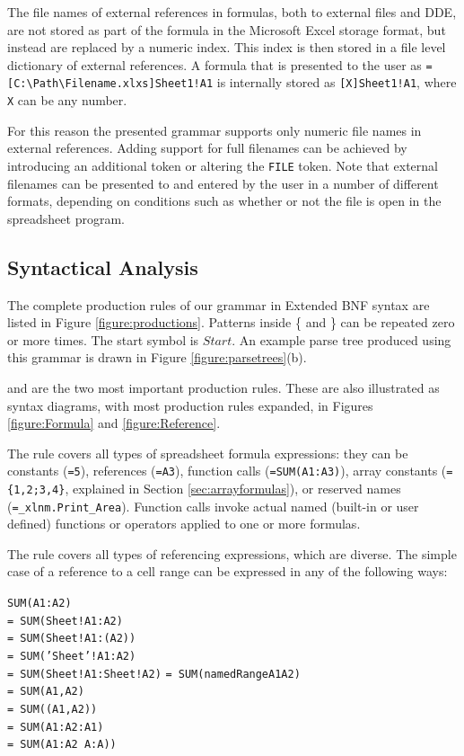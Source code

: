 \documentclass[conference]{IEEEtran}
\begin{document}
The file names of external references in formulas, both to external files and DDE, are not stored as part of the formula in the Microsoft Excel storage format, but instead are replaced by a numeric index.
This index is then stored in a file level dictionary of external references.
A formula that is presented to the user as \texttt{=[C:\textbackslash Path\textbackslash Filename.xlxs]Sheet1!A1} is internally stored as \texttt{[X]Sheet1!A1}, where \texttt{X} can be any number.

For this reason the presented grammar supports only numeric file names in external references.
Adding support for full filenames can be achieved by introducing an additional token or altering the \texttt{FILE} token. Note that external filenames can be presented to and entered by the user in a number of different formats, depending on conditions such as whether or not the file is open in the spreadsheet program.

\subsection{Syntactical Analysis}
\label{subsection:productionRules}

The complete production rules of our grammar in Extended BNF syntax are listed in Figure \ref{figure:productions}.
Patterns inside \{ and \} can be repeated zero or more times.
The start symbol is $Start$. An example parse tree produced using this grammar is drawn in Figure \ref{figure:parsetrees}(b).

 and  are the two most important production rules.
These are also illustrated as syntax diagrams, with most production rules expanded, in Figures \ref{figure:Formula} and \ref{figure:Reference}.

The  rule covers all types of spreadsheet formula expressions: they can be constants (\texttt{=5}), references (\texttt{=A3}), function calls (\texttt{=SUM(A1:A3)}), array constants (\texttt{=\{1,2;3,4\}}, explained in Section \ref{sec:arrayformulas}), or reserved names (\texttt{=_xlnm.Print_Area}). Function calls invoke actual named (built-in or user defined) functions or operators applied to one or more formulas.

The  rule covers all types of referencing expressions, which are diverse. The simple case of a reference to a cell range can be expressed in any of the following ways:

\begin{multicols}{2}
	\texttt{SUM(A1:A2)} \\ 
	\texttt{= SUM(Sheet!A1:A2)} \\
	\texttt{= SUM(Sheet!A1:(A2))} \\
	\texttt{= SUM('Sheet'!A1:A2)} \\
			\columnbreak
	\texttt{= SUM(Sheet!A1:Sheet!A2)}
	\texttt{= SUM(namedRangeA1A2)} \\ 
	\texttt{= SUM(A1,A2)} \\ 
	\texttt{= SUM((A1,A2))} \\ 
	\texttt{= SUM(A1:A2:A1)} \\
	\texttt{= SUM(A1:A2 A:A))} 
\end{multicols}
\end{document}

